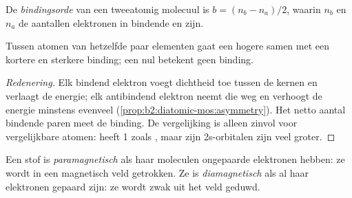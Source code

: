 \begin{definition}[Bindingsorde]\label{def:b2:diatomic-mos:bond-order}
De \emph{bindingsorde} van een tweeatomig molecuul is $b = (n_b -
n_a)/2$, waarin $n_b$ en $n_a$ de aantallen elektronen in bindende en
 zijn.
\end{definition}

\begin{proposition}\label{prop:b2:diatomic-mos:bond-order}
Tussen atomen van hetzelfde paar elementen gaat een hogere  samen met een
kortere en sterkere binding; een  nul betekent geen binding.
\end{proposition}

\begin{proof}[Redenering]
Elk bindend elektron voegt dichtheid toe tussen de kernen en verlaagt de energie;
elk antibindend elektron neemt die weg en verhoogt de energie minstens evenveel
(\cref{prop:b2:diatomic-mos:asymmetry}). Het netto aantal bindende paren meet
de binding. De vergelijking is alleen zinvol voor vergelijkbare atomen:  heeft
 1 zoals , maar zijn 2s-orbitalen zijn veel groter.
\end{proof}

\begin{definition}\label{def:b2:diatomic-mos:magnetism}
Een stof is \emph{paramagnetisch} als haar moleculen
ongepaarde elektronen hebben: ze wordt in een magnetisch veld getrokken. Ze is
\emph{diamagnetisch} als al haar elektronen gepaard zijn: ze wordt
zwak uit het veld geduwd.
\end{definition}

